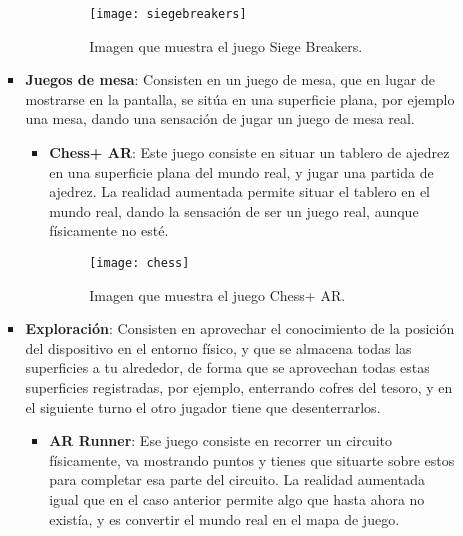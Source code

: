 \begin{itemize}
\begin{itemize}
\begin{itemize}
\begin{itemize}
    \begin{figure}[h]
      \centering
      \texttt{[image: siegebreakers]}
      \caption{Imagen que muestra el juego Siege Breakers.\protect\footnotemark}
      \label{figura-siege-breakers}
    \end{figure}

  \end{itemize}

  \newpage

  \item \textbf{Juegos de mesa}: Consisten en un juego de mesa, que en lugar de mostrarse en la pantalla, se sitúa en una superficie plana, por ejemplo una mesa, dando una sensación de jugar un juego de mesa real.

  \begin{itemize}
    \item \textbf{Chess+ AR}: Este juego consiste en situar un tablero de ajedrez en una superficie plana del mundo real, y jugar una partida de ajedrez. La realidad aumentada permite situar el tablero en el mundo real, dando la sensación de ser un juego real, aunque físicamente no esté.

    \begin{figure}[h]
      \centering
      \texttt{[image: chess]}
      \caption{Imagen que muestra el juego Chess+ AR.\protect\footnotemark}
      \label{figura-siege-breakers}
    \end{figure}

  \end{itemize}

  \newpage

  \item \textbf{Exploración}: Consisten en aprovechar el conocimiento de la posición del dispositivo en el entorno físico, y que se almacena todas las superficies a tu alrededor, de forma que se aprovechan todas estas superficies registradas, por ejemplo, enterrando cofres del tesoro, y en el siguiente turno el otro jugador tiene que desenterrarlos.

  \begin{itemize}
    \item \textbf{AR Runner}: Ese juego consiste en recorrer un circuito físicamente, va mostrando puntos y tienes que situarte sobre estos para completar esa parte del circuito. La realidad aumentada igual que en el caso anterior permite algo que hasta ahora no existía, y es convertir el mundo real en el mapa de juego.


\end{itemize}
\end{itemize}
\end{itemize}
\end{itemize}
